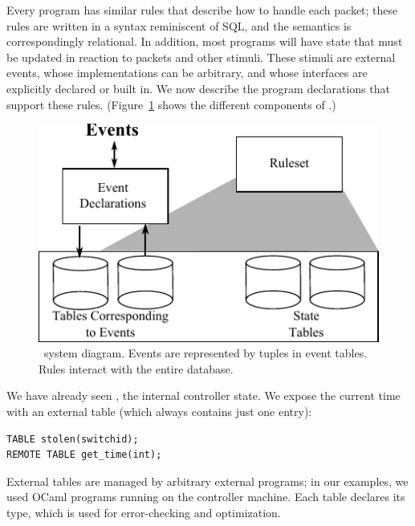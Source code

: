 Every program has similar rules that describe how to handle each packet;
these rules are written in a syntax reminiscent of SQL, and the semantics is
correspondingly relational. In addition, most programs will have state that
must be updated in reaction to packets and other stimuli.  These stimuli are
external events, whose implementations can be arbitrary, and whose interfaces
are explicitly declared or built in. We now describe the program declarations
that support these rules. (Figure~\ref{fig:events} shows the different
components of \flowlog.)

\begin{figure}
  \centering
  \includegraphics[scale=0.95]{figs/events-and-db.pdf}
  \caption{\small \flowlog\ system diagram. Events are represented by tuples
  in event tables. Rules interact with the entire database.}
  \label{fig:events}
\end{figure}

We have already seen , 
the internal controller state.
We expose the current time with an
external table  (which always contains just one entry):%
\noindent
\begin{lstlisting}[label=list:2]
TABLE stolen(switchid); 
REMOTE TABLE get_time(int); 
\end{lstlisting}
External tables are managed by arbitrary external programs; in our examples,
we used OCaml programs running on the controller machine. Each table
declares its type, which is used for error-checking and optimization.

